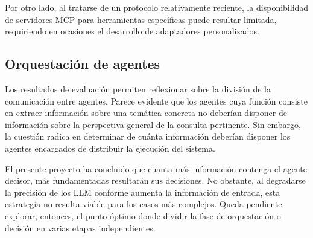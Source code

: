 Por otro lado, al tratarse de un protocolo relativamente reciente, la disponibilidad de servidores MCP para herramientas específicas puede resultar limitada, requiriendo en ocasiones el desarrollo de adaptadores personalizados. 

\subsection{Orquestación de agentes}
\label{sec:conc}
Los resultados de evaluación permiten reflexionar sobre la división de la comunicación entre agentes. Parece evidente que los agentes cuya función consiste en extraer información sobre una temática concreta no deberían disponer de información sobre la perspectiva general de la consulta pertinente. Sin embargo, la cuestión radica en determinar de cuánta información deberían disponer los agentes encargados de distribuir la ejecución del sistema.

El presente proyecto ha concluido que cuanta más información contenga el agente decisor, más fundamentadas resultarán sus decisiones. No obstante, al degradarse la precisión de los LLM conforme aumenta la información de entrada, esta estrategia no resulta viable para los casos más complejos. Queda pendiente explorar, entonces, el punto óptimo donde dividir la fase de orquestación o decisión en varias etapas independientes.


